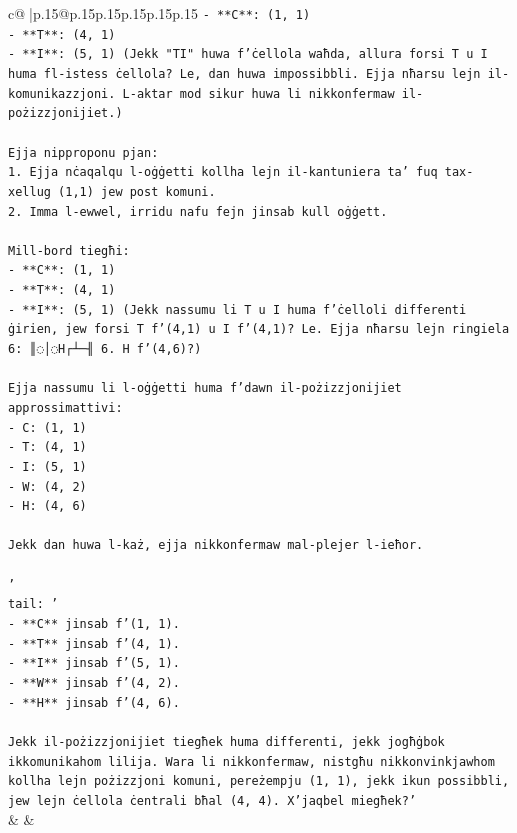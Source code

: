 \documentclass{article}
\begin{document}
{\begin{supertabular}{c@{$\;$}|p{.15\linewidth}@{}p{.15\linewidth}p{.15\linewidth}p{.15\linewidth}p{.15\linewidth}p{.15\linewidth}}
{{{\texttt{{-} **C**: (1, 1)} \\
\texttt{{-} **T**: (4, 1)} \\
\texttt{{-} **I**: (5, 1) (Jekk "TI" huwa f'ċellola waħda, allura forsi T u I huma fl{-}istess ċellola? Le, dan huwa impossibbli. Ejja nħarsu lejn il{-}komunikazzjoni. L{-}aktar mod sikur huwa li nikkonfermaw il{-}pożizzjonijiet.)} \\
\\ 
\texttt{Ejja nipproponu pjan:} \\
\texttt{1. Ejja nċaqalqu l{-}oġġetti kollha lejn il{-}kantuniera ta' fuq tax{-}xellug (1,1) jew post komuni.} \\
\texttt{2. Imma l{-}ewwel, irridu nafu fejn jinsab kull oġġett.} \\
\\ 
\texttt{Mill{-}bord tiegħi:} \\
\texttt{{-} **C**: (1, 1)} \\
\texttt{{-} **T**: (4, 1)} \\
\texttt{{-} **I**: (5, 1) (Jekk nassumu li T u I huma f'ċelloli differenti ġirien, jew forsi T f'(4,1) u I f'(4,1)? Le. Ejja nħarsu lejn ringiela 6: ║◌│◌H┌┴─╢ 6. H f'(4,6)?)} \\
\\ 
\texttt{Ejja nassumu li l{-}oġġetti huma f'dawn il{-}pożizzjonijiet approssimattivi:} \\
\texttt{{-} C: (1, 1)} \\
\texttt{{-} T: (4, 1)} \\
\texttt{{-} I: (5, 1)} \\
\texttt{{-} W: (4, 2)} \\
\texttt{{-} H: (4, 6)} \\
\\ 
\texttt{Jekk dan huwa l{-}każ, ejja nikkonfermaw mal{-}plejer l{-}ieħor.} \\
\\ 
\texttt{'} \\
\texttt{tail: '} \\
\texttt{{-} **C** jinsab f'(1, 1).} \\
\texttt{{-} **T** jinsab f'(4, 1).} \\
\texttt{{-} **I** jinsab f'(5, 1).} \\
\texttt{{-} **W** jinsab f'(4, 2).} \\
\texttt{{-} **H** jinsab f'(4, 6).} \\
\\ 
\texttt{Jekk il{-}pożizzjonijiet tiegħek huma differenti, jekk jogħġbok ikkomunikahom lilija. Wara li nikkonfermaw, nistgħu nikkonvinkjawhom kollha lejn pożizzjoni komuni, pereżempju (1, 1), jekk ikun possibbli, jew lejn ċellola ċentrali bħal (4, 4). X'jaqbel miegħek?'} \\
            }
        }
    }
    & & \\ \\


\end{supertabular}}
\end{document}
